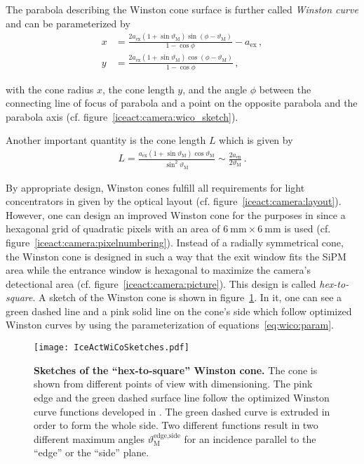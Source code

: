 The parabola describing the Winston cone surface is further called \textit{Winston curve} and can be parameterized by \cite{wico:book,iceact:camera}
\begin{subequations}
	\label{eq:wico:param}
	\begin{align}
	x &= \frac{2a_\text{ex}(1+\sin\vartheta_\text{M})\sin(\phi-\vartheta_\text{M})}{1-\cos\phi}-a_\text{ex}\,,\\
	y &= \frac{2a_\text{ex}(1+\sin\vartheta_\text{M})\cos(\phi-\vartheta_\text{M})}{1-\cos\phi}\,,
	\end{align}
\end{subequations}

with the cone radius $x$, the cone length $y$, and the angle $\phi$ between the connecting line of focus of parabola and a point on the opposite parabola and the parabola axis (cf. figure~\ref{iceact:camera:wico_sketch}).

Another important quantity is the cone length $L$ which is given by \cite{wico:book,iceact:camera}
\begin{align}
	L = \frac{a_\text{ex}(1+\sin\vartheta_\text{M})\cos\vartheta_\text{M}}{\sin^2\vartheta_\text{M}}\sim\frac{2a_\text{en}}{2\vartheta_\text{M}}\,.
\end{align}






By appropriate design, Winston cones fulfill all requirements for light concentrators in \iceact given by the optical layout (cf. figure~\ref{iceact:camera:layout}).
However, one can design an improved Winston cone for the purposes in \iceact since a hexagonal grid of quadratic pixels with an area of $\SI{6}{\milli\meter}\times\SI{6}{\milli\meter}$ is used (cf. figure~\ref{iceact:camera:pixelnumbering}). Instead of a radially symmetrical cone, the \iceact Winston cone is designed in such a way that the exit window fits the SiPM area while the entrance window is hexagonal to maximize the camera's detectional area (cf. figure~\ref{iceact:camera:picture}). This design is called \textit{hex-to-square}. A sketch of the \iceact Winston cone is shown in figure~\ref{iceact:camera:iceact_wico_sketch}. In it, one can see a green dashed line and a pink solid line on the cone's side which follow optimized Winston curves by using the parameterization of equations~\eqref{eq:wico:param}.

\begin{figure}[H]
	\centering
	\texttt{[image: IceActWiCoSketches.pdf]}
	\caption[Sketches of the \iceact \enquote{hex-to-square} Winston cone]{\textbf{Sketches of the \iceact \enquote{hex-to-square} Winston cone.} The cone is shown from different points of view with dimensioning. The pink edge and the green dashed surface line follow the optimized Winston curve functions developed in \cite{iceact:camera}. The green dashed curve is extruded in order to form the whole side. Two different functions result in two different maximum angles $\vartheta_\text{M}^\text{edge,side}$ for an incidence parallel to the \enquote{edge} or the \enquote{side} plane.}
	\label{iceact:camera:iceact_wico_sketch}	
\end{figure}

